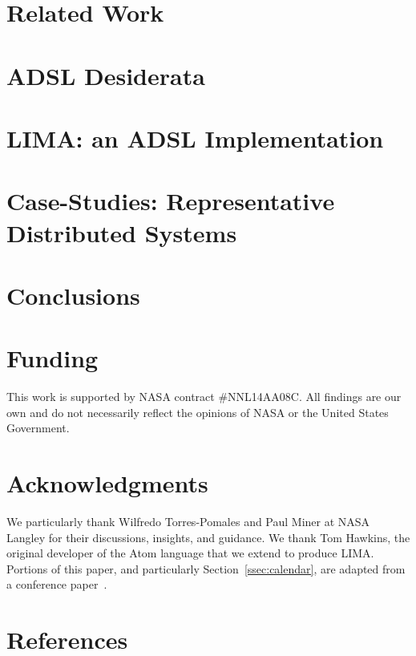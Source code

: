 \documentclass{AIAA_REVTeX41/AIAA}
\begin{document}
\section{Related Work}
\label{sec:current}



\section{ADSL Desiderata}
\label{sec:towards-adsl}



\section{LIMA: an ADSL Implementation}
\label{sec:adsl}



\section{Case-Studies: Representative Distributed Systems}
\label{sec:case-studies}






\section{Conclusions}
\label{sec:future-work}


\section*{Funding}
This work is supported by NASA contract \#NNL14AA08C. All findings are our own and do not necessarily reflect the opinions of NASA or the United States Government.

\section*{Acknowledgments}
We particularly thank Wilfredo Torres-Pomales and Paul Miner at NASA Langley for their discussions, insights, and guidance. We thank Tom Hawkins, the original developer of the Atom language that we extend to produce LIMA.
Portions of this paper, and particularly Section~\ref{ssec:calendar}, are adapted from a conference paper~\cite{jones:nfm17}.

\section*{References}

%

\end{document}
